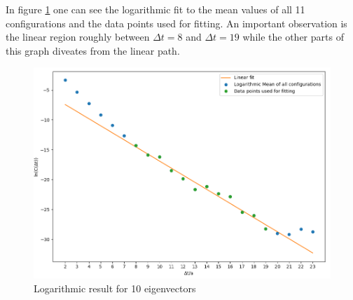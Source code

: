     In figure \ref{10_evs_log} one can see the logarithmic fit to the mean values of all 11 configurations and the data points used for fitting. An important observation is the linear region roughly between $\Delta t = 8$ and $\Delta t = 19$ while the other parts of this graph diveates from the linear path.
    
    \begin{figure}[H]
        \centering
        \includegraphics[width=1\textwidth]{images/10_log_fit.png}
        \caption{Logarithmic result for 10 eigenvectors}
        \label{10_evs_log}
    \end{figure}